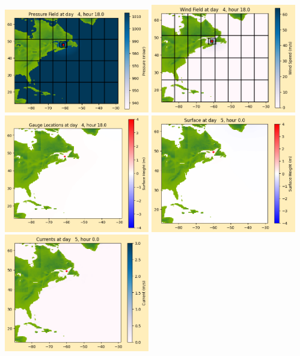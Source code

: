 \documentclass[11pt]{article}
\begin{document}
\includegraphics[width=0.475\textwidth]{frame0031fig1012.png}
\vskip 10pt 
\includegraphics[width=0.475\textwidth]{frame0031fig1013.png}
\includegraphics[width=0.475\textwidth]{frame0031fig1014.png}
\vskip 10pt 
\includegraphics[width=0.475\textwidth]{frame0032fig1001.png}
\includegraphics[width=0.475\textwidth]{frame0032fig1002.png}
\end{document}
